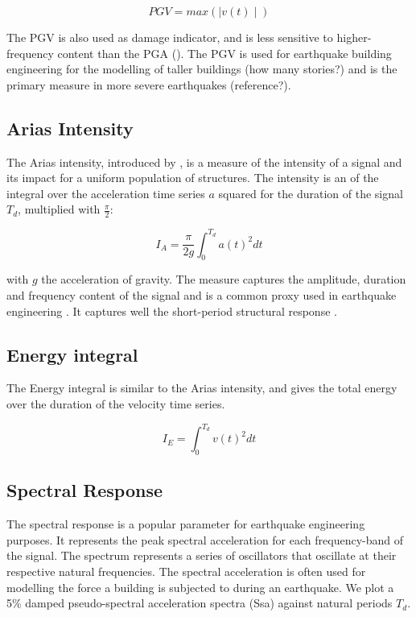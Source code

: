\documentclass[../Text/00main.tex]{subfiles}
\begin{document}
\begin{equation}
    PGV = max(\mid v(t) \mid)
\end{equation}

The PGV is also used as damage indicator, and is less sensitive to higher-frequency content than the PGA (\cite{kramer:1996}). The PGV is used for earthquake building engineering for the modelling of taller buildings (how many stories?) and is the primary measure in more severe earthquakes (reference?).  

\subsection{Arias Intensity}

The Arias intensity, introduced by \cite{arias1970measure}, is a measure of the intensity of a signal and its impact for a uniform population of structures. The intensity is an of the integral over the acceleration time series $a$ squared for the duration of the signal $T_d$, multiplied with  $\frac{\pi}{2}$:

\begin{equation}
    I_A = \frac{\pi}{2g} \int_0^{T_d} a(t)^2 dt
\end{equation}

with $g$ the acceleration of gravity. The measure captures the amplitude, duration and frequency content of the signal and is a common proxy used in earthquake engineering \cite{howard2008probabilistic}. It captures well the short-period structural response \cite{travasarou2003empirical}. 

\subsection{Energy integral}

The Energy integral is similar to the Arias intensity, and gives the total energy over the duration of the velocity time series. 

\begin{equation}
    I_E = \int_0^{T_d} v(t)^2 dt
\end{equation}

\subsection{Spectral Response}

The spectral response is a popular parameter for earthquake engineering purposes. It represents the peak spectral acceleration for each frequency-band of the signal.  The spectrum represents a series of oscillators that oscillate at their respective natural frequencies. The spectral acceleration is often used for modelling the force a building is subjected to during an earthquake. We plot a 5\% damped pseudo-spectral acceleration spectra (Ssa) against natural periods $T_d$. 
\end{document}
